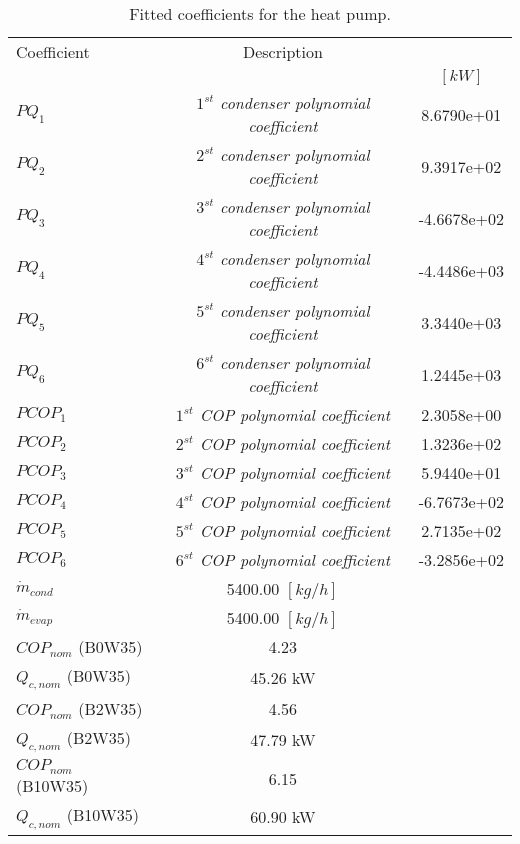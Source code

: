 \documentclass[english]{SPFShortReport}
\author{Dani Carbonell}
\begin{document}
\begin{table}[!ht]
\begin{small}
\caption{Fitted coefficients for the heat pump.}
\begin{center}
\resizebox{12cm}{!} 
{
\begin{tabular}{l | c c } 
\hline
\hline
Coefficient &Description & \\ 
 & &$[kW]$\\ 
\hline
$PQ_{1}$ & \emph{$1^{st}$ condenser polynomial coefficient}  & 8.6790e+01    \\ 
$PQ_{2}$ & \emph{$2^{st}$ condenser polynomial coefficient}  & 9.3917e+02    \\ 
$PQ_{3}$ & \emph{$3^{st}$ condenser polynomial coefficient}  & -4.6678e+02    \\ 
$PQ_{4}$ & \emph{$4^{st}$ condenser polynomial coefficient}  & -4.4486e+03    \\ 
$PQ_{5}$ & \emph{$5^{st}$ condenser polynomial coefficient}  & 3.3440e+03    \\ 
$PQ_{6}$ & \emph{$6^{st}$ condenser polynomial coefficient}  & 1.2445e+03    \\ 
\hline
$PCOP_{1}$ & \emph{$1^{st}$ COP polynomial coefficient}  & 2.3058e+00    \\ 
$PCOP_{2}$ & \emph{$2^{st}$ COP polynomial coefficient}  & 1.3236e+02    \\ 
$PCOP_{3}$ & \emph{$3^{st}$ COP polynomial coefficient}  & 5.9440e+01    \\ 
$PCOP_{4}$ & \emph{$4^{st}$ COP polynomial coefficient}  & -6.7673e+02    \\ 
$PCOP_{5}$ & \emph{$5^{st}$ COP polynomial coefficient}  & 2.7135e+02    \\ 
$PCOP_{6}$ & \emph{$6^{st}$ COP polynomial coefficient}  & -3.2856e+02    \\ 
\hline
$\dot m_{cond}$ & 5400.00 $[kg/h]$\\ 
$\dot m_{evap}$ & 5400.00 $[kg/h]$\\ 
\hline
$COP_{nom}$ (B0W35)& 4.23 \\ 
$Q_{c,nom}$ (B0W35)& 45.26 kW\\ 
$COP_{nom}$ (B2W35)& 4.56 \\ 
$Q_{c,nom}$ (B2W35)& 47.79 kW\\ 
$COP_{nom}$ (B10W35)& 6.15 \\ 
$Q_{c,nom}$ (B10W35)& 60.90 kW\\ 
\hline
\hline
\end{tabular}
}
\label{CoefTable}
\end{center}
\end{small}
\end{table}
\end{document}
